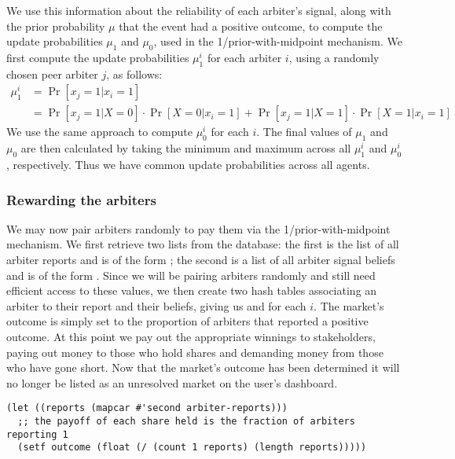 We use this information about the reliability of each arbiter's signal, along
with the prior probability $\mu$ that the event had a positive outcome, to
compute the update probabilities $\mu_1$ and $\mu_0$, used in the
1/prior-with-midpoint mechanism. We first compute the update
probabilities $\mu_1^i$ for each arbiter $i$, using a randomly chosen peer
arbiter $j$, as follows:
%
\begin{equation}
	\label{eq:updateProbabilities}
	\begin{aligned}
		\mu_1^i & = \Pr[x_j=1|x_i=1] \\
		& = \Pr[x_j=1|X=0] \cdot \Pr[X=0|x_i=1] + \Pr[x_j=1|X=1] \cdot
		\Pr[X=1|x_i=1]
	\end{aligned}
\end{equation}
%
We use the same approach to compute $\mu_0^i$ for each $i$. The final values of
$\mu_1$ and $\mu_0$ are then calculated by taking the minimum and maximum
across all $\mu_1^i$ and $\mu_0^i$, respectively. Thus we have common update
probabilities across all agents.

\subsubsection{Rewarding the arbiters}

We may now pair arbiters randomly to pay them via the 1/prior-with-midpoint
mechanism. We first retrieve two lists from the database: the first is the list
of all arbiter reports and is of the form ; the second is a list of all arbiter signal beliefs and is of the
form .
Since we will be pairing arbiters randomly and still need efficient access to
these values, we then create two hash tables associating an arbiter to their
report and their beliefs, giving us  and
 for each $i$. The
market's outcome is simply set to the proportion of arbiters that reported a
positive outcome. At this point we pay out the appropriate winnings to
stakeholders, paying out money to those who hold shares and demanding money
from those who have gone short. Now that the market's outcome has been
determined it will no longer be listed as an unresolved market on the user's
dashboard.

\begin{lstlisting}[float,
	label={lst:marketOutcome},
	caption={Computing the market outcome}]
(let ((reports (mapcar #'second arbiter-reports)))
  ;; the payoff of each share held is the fraction of arbiters reporting 1
  (setf outcome (float (/ (count 1 reports) (length reports)))))
\end{lstlisting}

